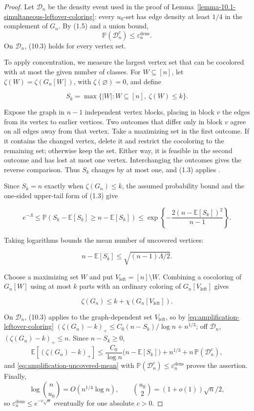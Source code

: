 \documentclass[a4paper,10pt,reqno]{amsart}
\numberwithin{equation}{section}
\newcommand{\Prob}[1]{\mathbb{P}\!\left(#1\right)}
\newcommand{\Exp}[1]{\mathbb{E}\!\left[#1\right]}
\theoremstyle{plain}
\theoremstyle{remark}
\begin{document}
\begin{proof}
Let $\mathcal D_n$ be the density event used in the proof of
Lemma~\ref{lemma-10.1-simultaneous-leftover-coloring}: every $u_0$-set has
edge density at least $1/4$ in the complement of $G_n$. By (1.5) and a
union bound,
\[
 \Prob{\mathcal D_n^c}\le\varepsilon_n^{\mathrm{dens}}.
\]
On $\mathcal D_n$, (10.3) holds for every vertex set.

To apply concentration, we measure the largest vertex set that can be
cocolored with at most the given number of classes. For $W\subseteq[n]$, let
$\zeta(W)=\zeta(G_n[W])$, with $\zeta(\varnothing)=0$, and define

\[
 S_{k}=\max\{|W|:W\subseteq[n],\ \zeta(W)\le k\}.  \tag{10.4}\label{eq:amplification-largest-set}
\]

Expose the graph in \(n-1\) independent vertex blocks, placing in block
\(v\) the edges from its vertex to earlier vertices. Two outcomes that differ
only in block \(v\) agree on all edges away from that vertex. Take a
maximizing set in the first outcome. If it contains the changed vertex,
delete it and restrict the cocoloring to the remaining set; otherwise keep
the set. Either way, it is feasible in the second outcome and has lost at
most one vertex. Interchanging the outcomes gives the reverse comparison.
Thus $S_{k}$ changes by at most one, and (1.3) applies
\citep[Theorem~3.1]{mcdiarmid-1998}.

Since $S_{k}=n$ exactly when $\zeta(G_n)\le k$,
the assumed probability bound and the one-sided upper-tail form of (1.3) give

\[
 e^{-\Lambda}
 \le\Prob{S_{k}-\Exp{S_{k}}\ge n-\Exp{S_{k}}}
 \le\exp\!\left\{-\frac{2(n-\Exp{S_{k}})^2}{n-1}\right\}.
\]

Taking logarithms bounds the mean number of uncovered vertices:

\[
 n-\Exp{S_{k}}\le\sqrt{(n-1)\Lambda/2}.              \tag{10.5}\label{eq:amplification-uncovered-mean}
\]

Choose a maximizing set \(W\) and put
\(V_{\mathrm{left}}=[n]\setminus W\). Combining a cocoloring of \(G_n[W]\)
using at most \(k\) parts with an ordinary coloring of
\(G_n[V_{\mathrm{left}}]\) gives

\[
 \zeta(G_n)\le k+\chi(G_n[V_{\mathrm{left}}]).         \tag{10.6}\label{eq:amplification-leftover-coloring}
\]

On $\mathcal D_n$, (10.3) applies to the graph-dependent set
$V_{\mathrm{left}}$, so by \eqref{eq:amplification-leftover-coloring}
$(\zeta(G_n)-k)_+\le C_0(n-S_k)/\log n+n^{1/3}$; off $\mathcal D_n$,
$(\zeta(G_n)-k)_+\le n$. Since $n-S_k\ge0$,
\[
 \Exp{(\zeta(G_n)-k)_+}\le\frac{C_0}{\log n}\bigl(n-\Exp{S_k}\bigr)+n^{1/3}
   +n\,\Prob{\mathcal D_n^c},
\]
and \eqref{eq:amplification-uncovered-mean} with
$\Prob{\mathcal D_n^c}\le\varepsilon_n^{\mathrm{dens}}$ proves the assertion.
Finally,
\[
 \log\binom n{u_0}=O(n^{1/4}\log n),\qquad
 \binom{u_0}{2}=(1+o(1))\sqrt n/2,
\]
so $\varepsilon_n^{\mathrm{dens}}\le e^{-c\sqrt n}$ eventually for one
absolute $c>0$.
\end{proof}
\end{document}
